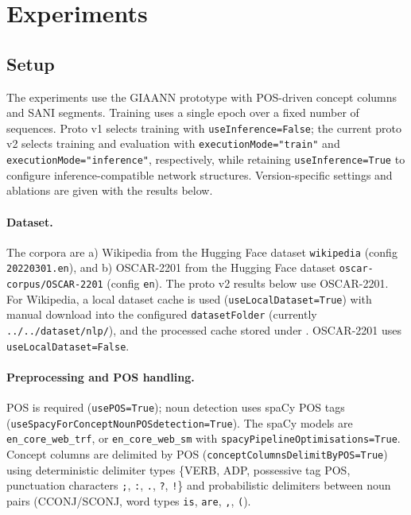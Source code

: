 \section{Experiments}

\subsection{Setup}

The experiments use the GIAANN prototype with POS-driven concept columns and SANI segments. Training uses a single epoch over a fixed number of sequences. Proto v1 selects training with \texttt{useInference=False}; the current proto v2 selects training and evaluation with \texttt{executionMode="train"} and \texttt{executionMode="inference"}, respectively, while retaining \texttt{useInference=True} to configure inference-compatible network structures. Version-specific settings and ablations are given with the results below.

\paragraph{Dataset.}
The corpora are a) Wikipedia from the Hugging Face dataset \texttt{wikipedia} (config \texttt{20220301.en}), and b) OSCAR-2201 from the Hugging Face dataset \texttt{oscar-corpus/OSCAR-2201} (config \texttt{en}). The proto v2 results below use OSCAR-2201. For Wikipedia, a local dataset cache is used (\texttt{useLocalDataset=True}) with manual download into the configured \texttt{datasetFolder} (currently \texttt{../../dataset/nlp/}), and the processed cache stored under . OSCAR-2201 uses \texttt{useLocalDataset=False}.

\paragraph{Preprocessing and POS handling.}
POS is required (\texttt{usePOS=True}); noun detection uses spaCy POS tags (\texttt{useSpacyForConceptNounPOSdetection=True}). The spaCy models are \texttt{en_core_web_trf}, or \texttt{en_core_web_sm} with \texttt{spacyPipelineOptimisations=True}. Concept columns are delimited by POS (\texttt{conceptColumnsDelimitByPOS=True}) using deterministic delimiter types \{VERB, ADP, possessive tag POS, punctuation characters \texttt{;}, \texttt{:}, \texttt{.}, \texttt{?}, \texttt{!}\} and probabilistic delimiters between noun pairs (CCONJ/SCONJ, word types \texttt{is}, \texttt{are}, \texttt{,}, \texttt{(}).

